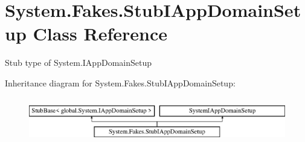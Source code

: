 \hypertarget{class_system_1_1_fakes_1_1_stub_i_app_domain_setup}{\section{System.\-Fakes.\-Stub\-I\-App\-Domain\-Setup Class Reference}
\label{class_system_1_1_fakes_1_1_stub_i_app_domain_setup}
}


Stub type of System.\-I\-App\-Domain\-Setup 


Inheritance diagram for System.\-Fakes.\-Stub\-I\-App\-Domain\-Setup\-:\begin{figure}[H]
\begin{center}
\leavevmode
\includegraphics[height=2.000000cm]{class_system_1_1_fakes_1_1_stub_i_app_domain_setup}
\end{center}
\end{figure}
